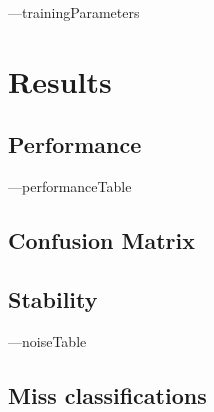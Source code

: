 \documentclass[12pt]{article}
\begin{document}
    ---trainingParameters

\section{Results}
\subsection{Performance}
---performanceTable
\subsection{Confusion Matrix}
\begin{figure}[H]
    \centering
\end{figure}
\subsection{Stability}

    ---noiseTable


\subsection{Miss classifications}
\begin{figure}[H]
    \centering
\end{figure}
\end{document}
